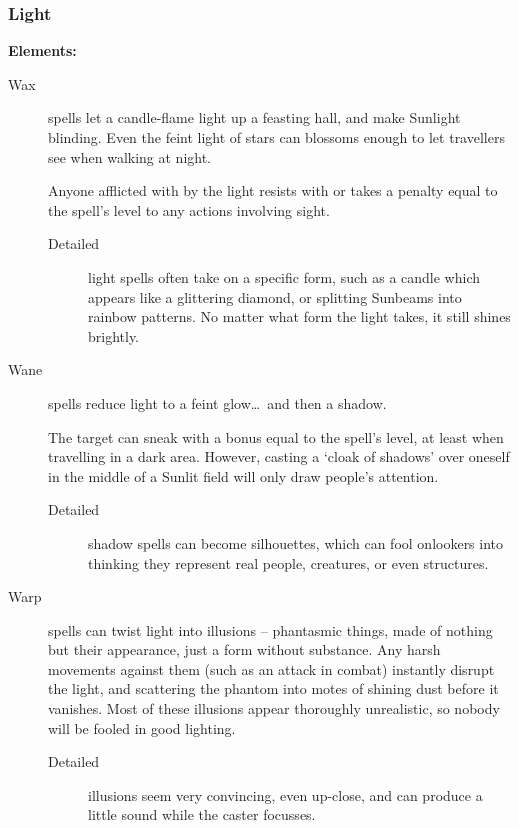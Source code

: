 \begin{multicols}{2}
\subsubsection{Light}

\textbf{Elements:}

\begin{description}
  \item[Wax]
    spells let a candle-flame light up a feasting hall, and make Sunlight blinding.
    Even the feint light of stars can blossoms enough to let travellers see when walking at night.

    Anyone afflicted with by the light resists with  or takes a penalty equal to the spell's level to any actions involving sight.
    \begin{description}
      \item[Detailed]
        light spells often take on a specific form, such as a candle which appears like a glittering diamond, or splitting Sunbeams into rainbow patterns.
        No matter what form the light takes, it still shines brightly.
    \end{description}
  \item[Wane]
    spells reduce light to a feint glow\ldots~and then a shadow.

    The target can sneak with a bonus equal to the spell's level, at least when travelling in a dark area.
    However, casting a `cloak of shadows' over oneself in the middle of a Sunlit field will only draw people's attention.
    \begin{description}
      \item[Detailed]
        shadow spells can become silhouettes, which can fool onlookers into thinking they represent real people, creatures, or even structures.
    \end{description}
  \item[Warp]
    spells can twist light into illusions -- phantasmic things, made of nothing but their appearance, just a form without substance.
    Any harsh movements against them (such as an attack in combat) instantly disrupt the light, and scattering the phantom into motes of shining dust before it vanishes.
    Most of these illusions appear thoroughly unrealistic, so nobody will be fooled in good lighting.
    \begin{description}
      \item[Detailed]
        illusions seem very convincing, even up-close, and can produce a little sound while the caster focusses.


\end{description}
\end{description}
\end{multicols}
